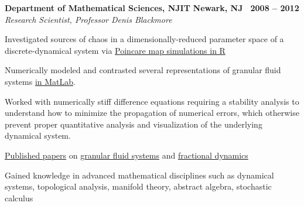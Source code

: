 \documentclass[10pt]{article}
\newcommand{\leftandright}[2]{\noindent\textbf{#1}\hfill
\textbf{#2}}
\begin{document}
\leftandright{Department of Mathematical Sciences, NJIT}{Newark, NJ \textbullet\, 2008 -- 2012}\\  
\vspace{-0.8em}
\textit{Research Scientist, Professor Denis Blackmore} 
\begin{itemize*}
  \item
    Investigated sources of chaos in a 
    dimensionally-reduced parameter space of a discrete-dynamical system via
    \href{http://kevin-urban.com/video/R__gamma-var_restitution-0.8.gif}{Poincare
    map simulations in R} 
  \item
    Numerically modeled and contrasted several representations of granular fluid systems
    \href{http://www.kevin-urban.com/images/gran_tapping-pics.png}{in
    MatLab}. 
  \item Worked with numerically stiff difference equations requiring a stability
    analysis to understand how to minimize the propagation of numerical errors, which otherwise
    prevent proper quantitative analysis and visualization of the underlying dynamical system.
  \item
    \href{http://msp.org/jomms/2011/6-1/jomms-v6-n1-p06-s.pdf}{Published
    papers} on
    \href{http://www.sciencedirect.com/science/article/pii/S0167278914000189}{granular
    fluid systems} and 
    \href{http://www.icmp.lviv.ua/journal/zbirnyk.64/}{fractional
    dynamics} 
  \item
    Gained knowledge in advanced mathematical disciplines such as
    dynamical systems, topological analysis, manifold theory, abstract
    algebra, stochastic calculus
\end{itemize*}

\end{document}

